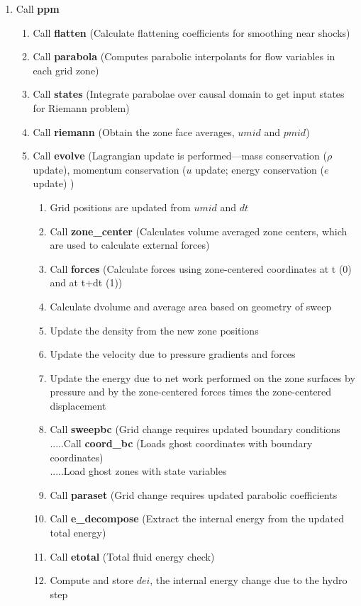 \documentclass[11pt,doublespace]{article}
\begin{document}
\begin{itemize}
\begin{enumerate}
\begin{enumerate}
  \item Call {\bf ppm}
\begin{enumerate}
  \item Call {\bf flatten} (Calculate flattening coefficients for smoothing near shocks)
  \item Call {\bf parabola} (Computes parabolic interpolants for flow variables in each grid zone)
  \item Call {\bf states} (Integrate parabolae over causal domain to get input states for Riemann problem)
  \item Call {\bf riemann} (Obtain the zone face averages, $umid$ and $pmid$)
  \item Call {\bf evolve} (Lagrangian update is performed---mass conservation ($\rho$ update), momentum conservation ($u$ update; energy conservation ($e$ update) )
\begin{enumerate}
  \item Grid positions are updated from $umid$ and $dt$
  \item Call {\bf zone\_center} (Calculates volume averaged zone centers, which are used to calculate external forces)
  \item Call {\bf forces} (Calculate forces using zone-centered coordinates at t (0) and at t+dt (1))
  \item Calculate dvolume and average area based on geometry of sweep
  \item Update the density from the new zone positions
  \item Update the velocity due to pressure gradients and forces
  \item Update the energy due to net work performed on the zone surfaces by pressure and by the zone-centered forces times the zone-centered displacement
  \item Call {\bf sweepbc} (Grid change requires updated boundary  conditions\\
.....Call {\bf coord\_bc} (Loads ghost coordinates with boundary coordinates)\\
.....Load ghost zones with state variables
  \item Call {\bf paraset} (Grid change requires updated parabolic coefficients
  \item Call {\bf e\_decompose} (Extract the internal energy from the updated total energy)
  \item Call {\bf etotal} (Total fluid energy check)
  \item Compute and store $dei$, the internal energy change due to the hydro step

\end{enumerate}
\end{enumerate}
\end{enumerate}
\end{enumerate}
\end{itemize}
\end{document}
